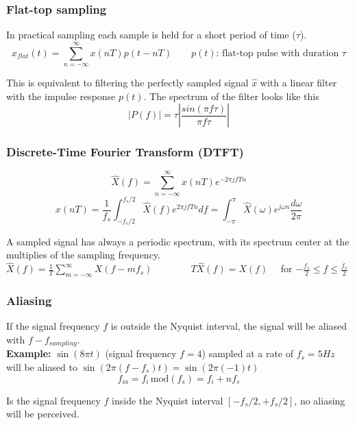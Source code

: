 \begin{center}

\end{center}

\subsubsection{Flat-top sampling }
In practical sampling each sample is held for a short period of time ($\tau$).
\[ x_{flat}(t) =  \sum_{n=-\infty}^{\infty}x(nT)p(t - nT) \qquad p(t) \text{: flat-top pulse with duration } \tau \]

This is equivalent to filtering the perfectly sampled signal $\hat{x}$ with a linear filter with the impulse response $p(t)$.
The spectrum of the filter looks like this
\[ |P(f)| = \tau \left| \frac{sin(\pi f \tau)}{\pi f \tau} \right| \]

\subsubsection{Discrete-Time Fourier Transform (DTFT)}
\[
	\hat{X}(f) = \sum_{n=-\infty}^{\infty} x(nT)e^{-2\pi jfTn}
\]
\[
	x(nT) = \frac{1}{f_s} \int_{-f_s/2}^{f_s/2}\hat{X}(f)e^{2\pi jfTn}df = \int_{-\pi}^{\pi}\hat{X}(\omega)e^{j\omega n} \frac{d \omega}{2 \pi}
\]

  A sampled signal has always a periodic spectrum, with its spectrum center at the multiplies of the sampling frequency.\\
  $\hat{X}(f) = \frac{1}{T}\sum\limits_{m=-\infty}^{\infty}X(f-mf_s) \qquad \qquad
  T\hat{X}(f) = X(f) \quad$ for $-\frac{f_s}{2} \leq f \leq \frac{f_s}{2}$





\subsubsection{Aliasing}
If the signal frequency $f$ is outside the Nyquist interval, the signal will be
aliased with $f - f_{sampling}$.\\
\textbf{Example:} $\sin(8\pi t)$ (signal frequency $f=4$) sampled at a rate of
$f_s=5Hz$ will be aliased to $\sin(2\pi (f-f_s) t) = \sin(2\pi (-1) t)$
\begin{equation}
	f_{ia} = f_i \, \text{mod}(f_s) = f_i + nf_s
\end{equation} 

Is the signal frequency $f$ inside the Nyquist interval $\left[-f_s/2,+f_s/2\right]$, no aliasing will be
perceived.

